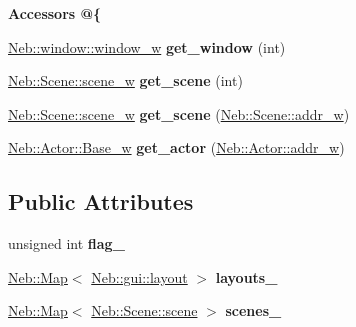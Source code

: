 \begin{Indent}{\bf \-Accessors @\{}\par
\begin{DoxyCompactItemize}
\item 
\hypertarget{classNeb_1_1app_a9e1237d528a0bfd338526751bff4a60d}{\hyperlink{classNeb_1_1weak__ptr}{\-Neb\-::window\-::window\-\_\-w} {\bfseries get\-\_\-window} (int)}\label{classNeb_1_1app_a9e1237d528a0bfd338526751bff4a60d}

\item 
\hypertarget{classNeb_1_1app_af34dfea535edde96fc5e5dfb67c37505}{\hyperlink{classNeb_1_1weak__ptr}{\-Neb\-::\-Scene\-::scene\-\_\-w} {\bfseries get\-\_\-scene} (int)}\label{classNeb_1_1app_af34dfea535edde96fc5e5dfb67c37505}

\item 
\hypertarget{classNeb_1_1app_ae37a92e33de6acf1fd0c338300862ca8}{\hyperlink{classNeb_1_1weak__ptr}{\-Neb\-::\-Scene\-::scene\-\_\-w} {\bfseries get\-\_\-scene} (\hyperlink{classNeb_1_1weak__ptr}{\-Neb\-::\-Scene\-::addr\-\_\-w})}\label{classNeb_1_1app_ae37a92e33de6acf1fd0c338300862ca8}

\item 
\hypertarget{classNeb_1_1app_a22284f20ae70f616792bceef3fa15bfe}{\hyperlink{classNeb_1_1weak__ptr}{\-Neb\-::\-Actor\-::\-Base\-\_\-w} {\bfseries get\-\_\-actor} (\hyperlink{classNeb_1_1weak__ptr}{\-Neb\-::\-Actor\-::addr\-\_\-w})}\label{classNeb_1_1app_a22284f20ae70f616792bceef3fa15bfe}

\end{DoxyCompactItemize}
\end{Indent}
\subsection*{\-Public \-Attributes}
\begin{DoxyCompactItemize}
\item 
\hypertarget{classNeb_1_1app_aa783110fd25666e9f15e8c9acb76192e}{unsigned int {\bfseries flag\-\_\-}}\label{classNeb_1_1app_aa783110fd25666e9f15e8c9acb76192e}

\item 
\hypertarget{classNeb_1_1app_abfe758c67e44f77f245a72dd15904f62}{\hyperlink{classNeb_1_1Map}{\-Neb\-::\-Map}$<$ \hyperlink{classNeb_1_1gui_1_1layout}{\-Neb\-::gui\-::layout} $>$ {\bfseries layouts\-\_\-}}\label{classNeb_1_1app_abfe758c67e44f77f245a72dd15904f62}

\item 
\hypertarget{classNeb_1_1app_a7defdddd97e1452710df87885cd48976}{\hyperlink{classNeb_1_1Map}{\-Neb\-::\-Map}$<$ \hyperlink{classNeb_1_1Scene_1_1scene}{\-Neb\-::\-Scene\-::scene} $>$ {\bfseries scenes\-\_\-}}\label{classNeb_1_1app_a7defdddd97e1452710df87885cd48976}

\end{DoxyCompactItemize}
